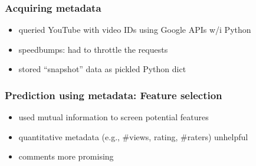 \documentclass[fleqn]{beamer}
\begin{document}
\begin{frame}
\frametitle{Acquiring metadata}
   \begin{itemize}
       \item queried YouTube with video IDs using Google APIs w/i Python
       \item speedbumps: had to throttle the requests
       \item stored ``snapshot'' data as pickled Python dict
   \end{itemize}
\end{frame}

\begin{frame}
\frametitle{Prediction using metadata: Feature selection}
      \begin{itemize}
          \item used mutual information to screen potential features
          \item quantitative metadata (e.g., \#views, rating, \#raters) unhelpful
          \item comments more promising
      \end{itemize}

\end{frame}
\end{document}
